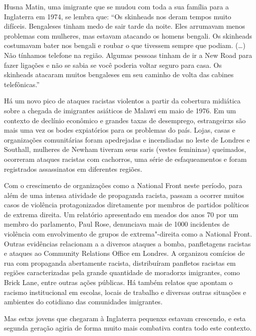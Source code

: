 Husna Matin, uma imigrante que se mudou com toda a sua família para a Inglaterra em 1974, se lembra que: ``Os skinheads nos deram tempos muito difíceis. Bengaleses tinham medo de sair tarde da noite. Eles arrumavam menos problemas com mulheres, mas estavam atacando os homens bengali. Os skinheads costumavam bater nos bengali e roubar o que tivessem sempre que podiam. (\ldots{}) Não tínhamos telefone na região. Algumas pessoas tinham de ir a New Road para fazer ligações e não se sabia se você poderia voltar seguro para casa. Os skinheads atacaram muitos bengaleses em seu caminho de volta das cabines telefônicas.''

Há um novo pico de ataques racistas violentos a partir da cobertura midiática sobre a chegada de imigrantes asiáticos de Malawi em maio de 1976. Em um contexto de declínio econômico e grandes taxas de desemprego, estrangeirxs são mais uma vez os bodes expiatórios para os problemas do país. Lojas, casas e organizações comunitárias foram apedrejadas e incendiadas no leste de Londres e Southall, mulheres de Newham tiveram seus saris (vestes femininas) queimados, ocorreram ataques racistas com cachorros, uma série de esfaqueamentos e foram registrados assassinatos em diferentes regiões.

Com o crescimento de organizações como a National Front neste período, para além de uma intensa atividade de propaganda racista, passam a ocorrer muitos casos de violência protagonizados diretamente por membros de partidos políticos de extrema direita. Um relatório apresentado em meados dos anos 70 por um membro do parlamento, Paul Rose, denunciava mais de 1000 incidentes de violência com envolvimento de grupos de extrema"-direita como a National Front. Outras evidências relacionam a  a diversos ataques a bomba, panfletagens racistas e ataques ao Community Relations Office em Londres. A  organizou comícios de rua com propaganda abertamente racista, distribuíram panfletos racistas em regiões caracterizadas pela grande quantidade de moradorxs imigrantes, como Brick Lane, entre outras ações públicas. Há também relatos que apontam o racismo institucional em escolas, locais de trabalho e diversas outras situações e ambientes do cotidiano das comunidades imigrantes.

Mas estxs jovens que chegaram à Inglaterra pequenxs estavam crescendo, e esta segunda geração agiria de forma muito mais combativa contra todo este contexto.

